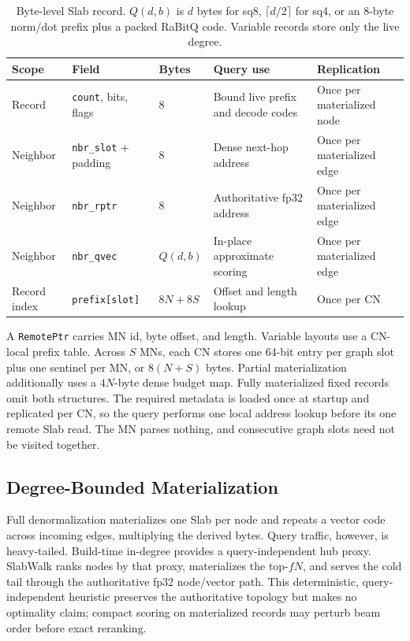 \documentclass[sigconf,nonacm]{acmart}
\begin{document}
\begin{table}[t]
\centering\small
\caption{Byte-level Slab record.  $Q(d,b)$ is $d$ bytes for sq8,
$\lceil d/2\rceil$ for sq4, or an 8-byte norm/dot prefix plus a packed RaBitQ
code.  Variable records store only the live degree.}
\label{tab:slab-layout}
\setlength{\tabcolsep}{3pt}
\begin{tabular}{L{0.13\textwidth}L{0.19\textwidth}L{0.11\textwidth}L{0.27\textwidth}L{0.18\textwidth}}
\toprule
Scope & Field & Bytes & Query use & Replication \\
\midrule
Record & \texttt{count}, bits, flags & 8 & Bound live prefix and decode codes & Once per materialized node \\
Neighbor & \texttt{nbr\_slot} + padding & 8 & Dense next-hop address & Once per materialized edge \\
Neighbor & \texttt{nbr\_rptr} & 8 & Authoritative fp32 address & Once per materialized edge \\
Neighbor & \texttt{nbr\_qvec} & $Q(d,b)$ & In-place approximate scoring & Once per materialized edge \\
Record index & \texttt{prefix[slot]} & $8N+8S$ & Offset and length lookup & Once per CN \\
\bottomrule
\end{tabular}
\end{table}

A \texttt{RemotePtr} carries MN id, byte offset, and length.  Variable layouts
use a CN-local prefix table.  Across $S$ MNs, each CN stores one
64-bit entry per graph slot plus one sentinel per MN, or $8(N+S)$ bytes.
Partial materialization additionally uses a $4N$-byte dense budget map.  Fully
materialized fixed records omit both structures.  The required metadata is loaded once at startup and
replicated per CN, so the query performs one local address lookup before its
one remote Slab read.  The MN parses nothing, and consecutive graph slots need
not be visited together.

\subsection{Degree-Bounded Materialization}
\label{sec:budget}

Full denormalization materializes one Slab per node and repeats a vector code
across incoming edges, multiplying the derived bytes.  Query traffic, however,
is heavy-tailed.  Build-time in-degree provides a query-independent hub proxy.
SlabWalk ranks nodes by that proxy, materializes the top-$fN$, and serves the
cold tail through the authoritative fp32 node/vector path.  This deterministic,
query-independent heuristic preserves the authoritative topology but makes no
optimality claim; compact scoring on materialized records may perturb beam
order before exact reranking.
\end{document}
